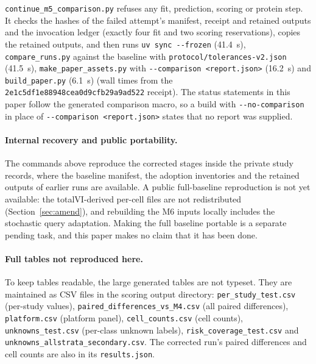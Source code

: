 \documentclass[11pt]{article}
\newcommand{\ccontid}{\nolinkurl{2e1c5df1e88948cea0d9cfb29a9ad522}}
\begin{document}
\nolinkurl{continue_m5_comparison.py} refuses any fit, prediction, scoring or protein step. It checks the hashes of the failed attempt's manifest, receipt and retained outputs and the invocation ledger (exactly four fit and two scoring reservations), copies the retained outputs, and then runs \verb|uv sync --frozen| (41.4~s), \nolinkurl{compare_runs.py} against the baseline with \nolinkurl{protocol/tolerances-v2.json} (41.5~s), \nolinkurl{make_paper_assets.py} with \verb|--comparison <report.json>| (16.2~s) and \nolinkurl{build_paper.py} (6.1~s) (wall times from the \ccontid{} receipt). The status statements in this paper follow the generated comparison macro, so a build with \verb|--no-comparison| in place of \verb|--comparison <report.json>| states that no report was supplied.

\paragraph{Internal recovery and public portability.} The commands above reproduce the corrected stages inside the private study records, where the baseline manifest, the adoption inventories and the retained outputs of earlier runs are available. A public full-baseline reproduction is not yet available: the totalVI-derived per-cell files are not redistributed (Section~\ref{sec:amend}), and rebuilding the M6 inputs locally includes the stochastic query adaptation. Making the full baseline portable is a separate pending task, and this paper makes no claim that it has been done.

\paragraph{Full tables not reproduced here.} To keep tables readable, the large generated tables are not typeset. They are maintained as CSV files in the scoring output directory: \nolinkurl{per_study_test.csv} (per-study values), \nolinkurl{paired_differences_vs_M4.csv} (all paired differences), \nolinkurl{platform.csv} (platform panel), \nolinkurl{cell_counts.csv} (cell counts), \nolinkurl{unknowns_test.csv} (per-class unknown labels), \nolinkurl{risk_coverage_test.csv} and \nolinkurl{unknowns_allstrata_secondary.csv}. The corrected run's paired differences and cell counts are also in its \nolinkurl{results.json}.
\end{document}
